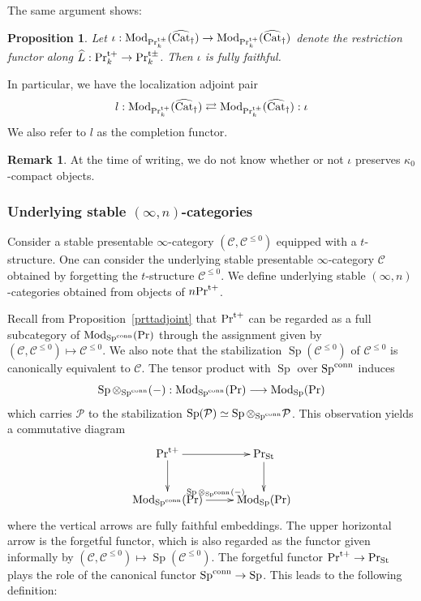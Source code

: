 \documentclass[leqno,12pt]{amsart}
\theoremstyle{plain}
\newtheorem{Proposition}[Theorem]{Proposition}
\theoremstyle{definition}
\newtheorem{Remark}[Theorem]{Remark}
\newcommand{\CCC}{\mathcal{C}}
\newcommand{\PR}{\textup{Pr}}
\newcommand{\PRTT}{\textup{Pr}^{\textup{t}+}}
\newcommand{\PRTTT}{\textup{Pr}^{\textup{t}\pm}}
\newcommand{\PPP}{\mathcal{P}}
\newcommand{\SP}{\operatorname{Sp}}
\newcommand{\SPC}{\operatorname{Sp}^{\textup{conn}}}
\newcommand{\Mod}{\operatorname{Mod}}
\newcommand{\vCat}{\widehat{\operatorname{Cat}}_\dagger}
\newcommand{\PRST}{\PR_{\textup{St}}}
\begin{document}
The same argument shows: 

\begin{Proposition}
Let $\iota:\Mod_{\PRTTT_k}(\vCat)\to \Mod_{\PRTT_k}(\vCat)$ denote the restriction functor along $\widehat{L}:\PRTT_k\to \PRTTT_k$.
Then $\iota$ is fully faithful.
\end{Proposition}

In particular, we have the localization adjoint pair
\[
l:\Mod_{\PRTT_k}(\vCat) \rightleftarrows \Mod_{\PRTTT_k}(\vCat):\iota
\]
We also refer to $l$ as the completion functor.

\begin{Remark}
At the time of writing,
we do not know whether or not $\iota$ preserves $\kappa_0$-compact objects.
\end{Remark}


\subsubsection{Underlying stable $(\infty,n)$-categories}
Consider a stable presentable $\infty$-category $(\CCC,\CCC^{\le0})$ equipped with a $t$-structure.
One can consider the underlying stable presentable $\infty$-category $\CCC$
obtained by forgetting the $ t$-structure $\CCC^{\le0}$.
We define underlying stable $(\infty,n)$-categories
obtained from objects of $n\PRTT$.


Recall from Proposition~\ref{prttadjoint} that  
$\PRTT$ can be regarded as a full subcategory
of $\Mod_{\SPC}(\PR)$ through the assignment given by $(\CCC,\CCC^{\le0})\mapsto \CCC^{\le0}$.
We also note that the stabilization $\SP(\CCC^{\le0})$ of $\CCC^{\le0}$ is canonically equivalent to
$\CCC$. 
The tensor product with $\SP$ over $\SPC$ induces 
\[
\SP\otimes_{\SPC}(-):\Mod_{\SPC}(\PR)\longrightarrow \Mod_{\SP}(\PR)
\]
which carries $\PPP$ to the stabilization $\SP(\PPP)\simeq \SP\otimes_{\SPC}\PPP$.
This observation yields a commutative diagram
\[
\xymatrix{
\PRTT \ar[r] \ar[d] &  \PRST \ar[d] \\
\Mod_{\SPC}(\PR)\ar[r]^{\SP\otimes_{\SPC}(-)}  &   \Mod_{\SP}(\PR)
}
\]
where the vertical arrows are fully faithful embeddings.
The upper horizontal arrow is the forgetful functor, which is also regarded as
the functor given informally by $(\CCC,\CCC^{\le0})\mapsto \SP(\CCC^{\le0})$.
The forgetful functor $\PRTT\to \PRST$
plays  the role of the canonical functor $\SPC\to \SP$.
This leads to the following definition:
\end{document}
